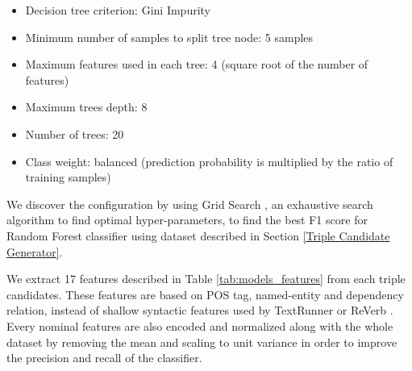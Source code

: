 \begin{itemize}
\item Decision tree criterion: Gini Impurity
\item Minimum number of samples to split tree node: 5 samples
\item Maximum features used in each tree: 4 (square root of the number of features)
\item Maximum trees depth: 8
\item Number of trees: 20
\item Class weight: balanced (prediction probability is multiplied by the ratio of training samples)
\end{itemize}

We discover the configuration by using Grid Search \citep{wasserman2015grid}, an exhaustive search algorithm to find optimal hyper-parameters, to find the best F1 score for Random Forest classifier using dataset described in Section \ref{Triple Candidate Generator}. 

We extract 17 features described in Table \ref{tab:models_features} from each triple candidates. These features are based on POS tag, named-entity and dependency relation, instead of shallow syntactic features used by TextRunner or ReVerb \citep{banko2007open} \citep{etzioni2011open}. Every nominal features are also encoded and normalized along with the whole dataset by removing the mean and scaling to unit variance in order to improve the precision and recall of the classifier.

